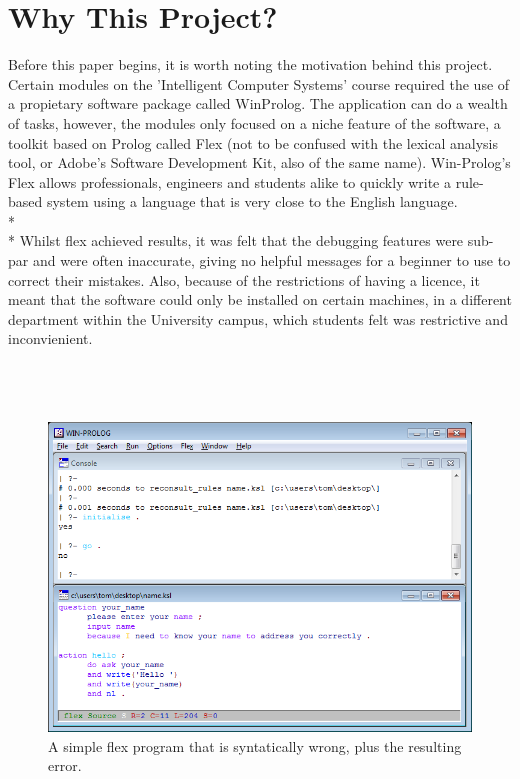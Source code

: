 \documentclass[12pt]{report}
\begin{document}
\section[Why This Project?]{Why This Project?}\label{sec:why_this_project}
Before this paper begins, it is worth noting the motivation behind this project.  Certain modules on the 'Intelligent Computer Systems' course required the use of a propietary software package called WinProlog.  The application can do a wealth of tasks, however, the modules only focused on a niche feature of the software, a toolkit based on Prolog called Flex (not to be confused with the lexical analysis tool, or Adobe's Software Development Kit, also of the same name).  Win-Prolog's Flex allows professionals, engineers and students alike to quickly write a rule-based system using a language that is very close to the English language.
\\*
\\*
Whilst flex achieved results, it was felt that the debugging features were sub-par and were often inaccurate, giving no helpful messages for a beginner to use to correct their mistakes.  Also, because of the restrictions of having a licence, it meant that the software could only be installed on certain machines, in a different department within the University campus, which students felt was restrictive and inconvienient.
\\
\\
\\
\\
\begin{figure}[h!]
	\centering
		\includegraphics[scale=0.85]{flexfail}
		\caption{A simple flex program that is syntatically wrong, plus the resulting error.}
\end{figure}
\end{document}
